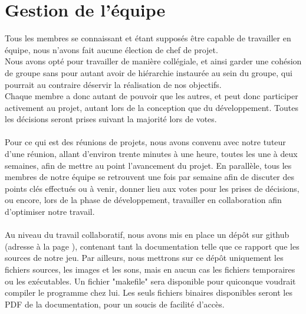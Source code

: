 \documentclass[a4paper]{memoir}
\begin{document}
		\section{Gestion de l'équipe}
			Tous les membres se connaissant et étant supposés être capable de travailler en équipe, nous n'avons fait aucune élection de chef de projet.\\
			Nous avons opté pour travailler de manière collégiale, et ainsi garder une cohésion de groupe sans pour autant avoir de hiérarchie instaurée au sein du groupe, qui pourrait au contraire déservir la réalisation de nos objectifs.\\
			Chaque membre a donc autant de pouvoir que les autres, et peut donc participer activement au projet, autant lors de la conception que du développement. Toutes les décisions seront prises suivant la majorité lors de votes.\\\\
			Pour ce qui est des réunions de projets, nous avons convenu avec notre tuteur d'une réunion, allant d'environ trente minutes à une heure, toutes les une à deux semaines, afin de mettre au point l'avancement du projet. En parallèle, tous les membres de notre équipe se retrouvent une fois par semaine afin de discuter des points clés effectués ou à venir, donner lieu aux votes pour les prises de décisions, ou encore, lors de la phase de développement, travailler en collaboration afin d'optimiser notre travail.\\\\
			Au niveau du travail collaboratif, nous avons mis en place un dépôt sur github (adresse à la page \pageref{url:github}), contenant tant la documentation telle que ce rapport que les sources de notre jeu. Par ailleurs, nous mettrons sur ce dépôt uniquement les fichiers sources, les images et les sons, mais en aucun cas les fichiers temporaires ou les exécutables. Un fichier "makefile" sera disponible pour quiconque voudrait compiler le programme chez lui. Les seuls fichiers binaires disponibles seront les PDF de la documentation, pour un soucis de facilité d'accès.
\end{document}
